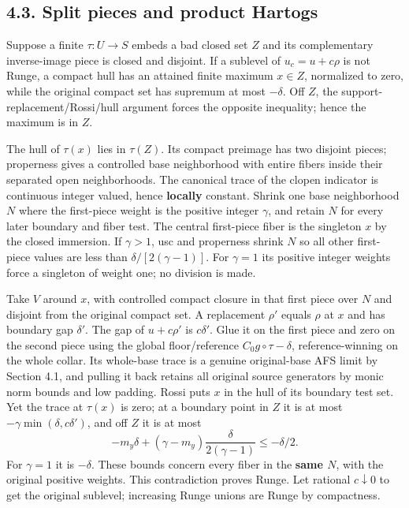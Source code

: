 \documentclass[
  10pt,
]{article}
\begin{document}
\subsection{4.3. Split pieces and product
Hartogs}\label{split-pieces-and-product-hartogs}

Suppose a finite \(\tau:U\to S\) embeds a bad closed set \(Z\) and its
complementary inverse-image piece is closed and disjoint. If a sublevel
of \(u_c=u+c\rho\) is not Runge, a compact hull has an attained finite
maximum \(x\in Z\), normalized to zero, while the original compact set
has supremum at most \(-\delta\). Off \(Z\), the
support-replacement/Rossi/hull argument forces the opposite inequality;
hence the maximum is in \(Z\).

The hull of \(\tau(x)\) lies in \(\tau(Z)\). Its compact preimage has
two disjoint pieces; properness gives a controlled base neighborhood
with entire fibers inside their separated open neighborhoods. The
canonical trace of the clopen indicator is continuous integer valued,
hence \textbf{locally} constant. Shrink one base neighborhood \(N\)
where the first-piece weight is the positive integer \(\gamma\), and
retain \(N\) for every later boundary and fiber test. The central
first-piece fiber is the singleton \(x\) by the closed immersion. If
\(\gamma>1\), usc and properness shrink \(N\) so all other first-piece
values are less than \(\delta/[2(\gamma-1)]\). For \(\gamma=1\) its
positive integer weights force a singleton of weight one; no division is
made.

Take \(V\) around \(x\), with controlled compact closure in that first
piece over \(N\) and disjoint from the original compact set. A
replacement \(\rho'\) equals \(\rho\) at \(x\) and has boundary gap
\(\delta'\). The gap of \(u+c\rho'\) is \(c\delta'\). Glue it on the
first piece and zero on the second piece using the global
floor/reference \(C_0g\circ\tau-\delta\), reference-winning on the whole
collar. Its whole-base trace is a genuine original-base AFS limit by
Section 4.1, and pulling it back retains all original source generators
by monic norm bounds and low padding. Rossi puts \(x\) in the hull of
its boundary test set. Yet the trace at \(\tau(x)\) is zero; at a
boundary point in \(Z\) it is at most \(-\gamma\min(\delta,c\delta')\),
and off \(Z\) it is at most
\[-m_y\delta+(\gamma-m_y)\frac{\delta}{2(\gamma-1)}\le-\delta/2.\] For
\(\gamma=1\) it is \(-\delta\). These bounds concern every fiber in the
\textbf{same \(N\)}, with the original positive weights. This
contradiction proves Runge. Let rational \(c\downarrow0\) to get the
original sublevel; increasing Runge unions are Runge by compactness.
\end{document}
